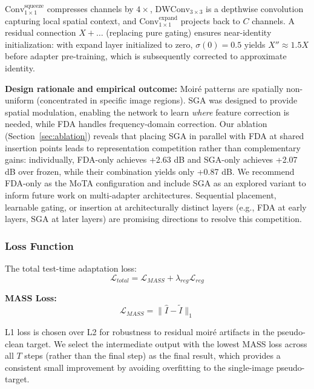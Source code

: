 \documentclass[10pt,twocolumn,letterpaper]{article}
\begin{document}
$\text{Conv}_{1\times 1}^{\text{squeeze}}$ compresses channels by $4\times$, $\text{DWConv}_{3\times 3}$ is a depthwise convolution capturing local spatial context, and $\text{Conv}_{1\times 1}^{\text{expand}}$ projects back to $C$ channels. A residual connection $X + \dots$ (replacing pure gating) ensures near-identity initialization: with expand layer initialized to zero, $\sigma(0)=0.5$ yields $X'' \approx 1.5X$ before adapter pre-training, which is subsequently corrected to approximate identity.

\textbf{Design rationale and empirical outcome:} Moir\'{e} patterns are spatially non-uniform (concentrated in specific image regions). SGA was designed to provide spatial modulation, enabling the network to learn \textit{where} feature correction is needed, while FDA handles frequency-domain correction. Our ablation (Section~\ref{sec:ablation}) reveals that placing SGA in parallel with FDA at shared insertion points leads to representation competition rather than complementary gains: individually, FDA-only achieves +2.63 dB and SGA-only achieves +2.07 dB over frozen, while their combination yields only +0.87 dB. We recommend FDA-only as the MoTA configuration and include SGA as an explored variant to inform future work on multi-adapter architectures. Sequential placement, learnable gating, or insertion at architecturally distinct layers (e.g., FDA at early layers, SGA at later layers) are promising directions to resolve this competition.

\subsubsection{Loss Function}

The total test-time adaptation loss:
\begin{equation}
\mathcal{L}_{total} = \mathcal{L}_{MASS} + \lambda_{reg} \mathcal{L}_{reg}
\end{equation}

\textbf{MASS Loss:}
\begin{equation}
\mathcal{L}_{MASS} = \|\hat{I} - \tilde{I}\|_1
\end{equation}

L1 loss is chosen over L2 for robustness to residual moir\'{e} artifacts in the pseudo-clean target. We select the intermediate output with the lowest MASS loss across all $T$ steps (rather than the final step) as the final result, which provides a consistent small improvement by avoiding overfitting to the single-image pseudo-target.
\end{document}
